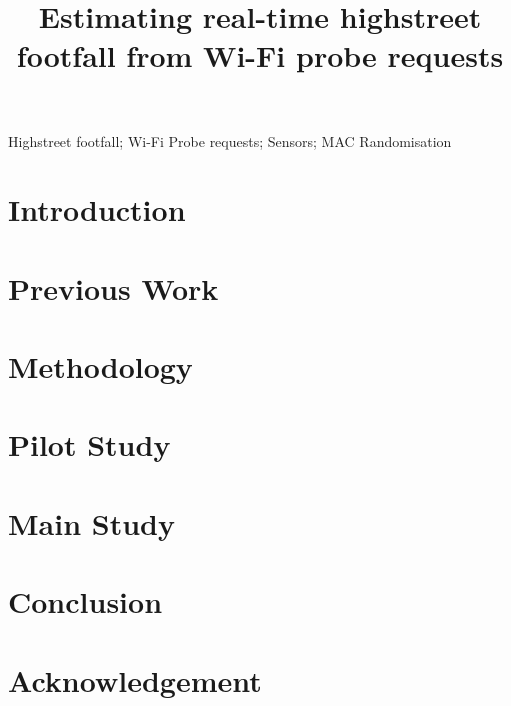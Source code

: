 \documentclass[]{interact}
\theoremstyle{plain}
\theoremstyle{definition}
\theoremstyle{remark}
\begin{document}
	\title{Estimating real-time highstreet footfall from Wi-Fi probe requests}
	\author{
	}
	\maketitle

	\begin{abstract}
		 \end{abstract}
	\begin{keywords}
		Highstreet footfall; Wi-Fi Probe requests; Sensors; MAC Randomisation \end{keywords}
	\section{Introduction}\label{introduction}
		
	\section{Previous Work}\label{previous_work}
		
	\section{Methodology}\label{methodology}
		
	\section{Pilot Study}\label{pilot_study}
		
	\section{Main Study}\label{main_study}
		
	\section{Conclusion}\label{conclusion}
		
	\section*{Acknowledgement}
		
	 
\end{document}
